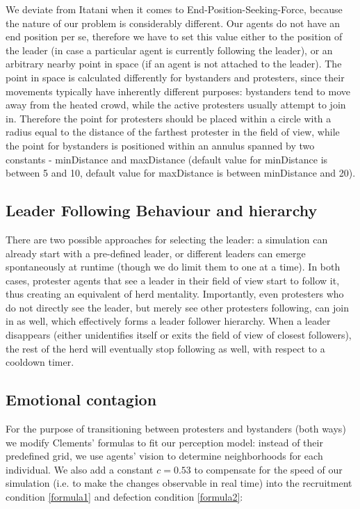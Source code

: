 \documentclass[9pt]{pnas-new}
\begin{document}
\bigskip
We deviate from Itatani \cite{socialcrowdsimulation} when it comes to End-Position-Seeking-Force, because the nature of our problem is considerably different. Our agents do not have an end position per se, therefore we have to set this value either to the position of the leader (in case a particular agent is currently following the leader), or an arbitrary nearby point in space (if an agent is not attached to the leader). The point in space is calculated differently for bystanders and protesters, since their movements typically have inherently different purposes: bystanders tend to move away from the heated crowd, while the active protesters usually attempt to join in. Therefore the point for protesters should be placed within a circle with a radius equal to the distance of the farthest protester in the field of view, while the point for bystanders is positioned within an annulus spanned by two constants - minDistance and maxDistance (default value for minDistance is between 5 and 10, default value for maxDistance is between minDistance and 20). 

\subsection*{Leader Following Behaviour and hierarchy} 

There are two possible approaches for selecting the leader: a simulation can already start with a pre-defined leader, or different leaders can emerge spontaneously at runtime (though we do limit them to one at a time). In both cases, protester agents that see a leader in their field of view start to follow it, thus creating an equivalent of herd mentality. Importantly, even protesters who do not directly see the leader, but merely see other protesters following, can join in as well, which effectively forms a leader follower hierarchy. When a leader disappears (either unidentifies itself or exits the field of view of closest followers), the rest of the herd will eventually stop following as well, with respect to a cooldown timer. 

\subsection*{Emotional contagion}

For the purpose of transitioning between protesters and bystanders (both ways) we modify Clements' formulas to fit our perception model: instead of their predefined grid, we use agents' vision to determine neighborhoods for each individual. We also add a constant $c=0.53$ to compensate for the speed of our simulation (i.e. to make the changes observable in real time) into the recruitment condition \ref{formula1} and defection condition \ref{formula2}:
\end{document}

